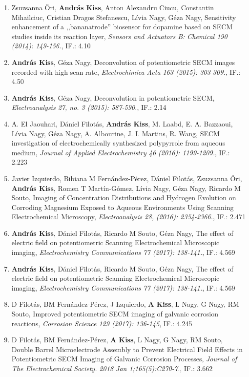 \documentclass[11pt,a4paper,roman]{article}
\begin{document}
\begin{enumerate}
\item Zsuzsanna \H{O}ri, \textbf{András Kiss}, Anton Alexandru Ciucu, Constantin Mihailciuc, Cristian Dragos Stefanescu, Lívia Nagy, Géza Nagy, Sensitivity enhancement of a ,,bananatrode'' biosensor for dopamine based on SECM studies inside its reaction layer, \emph{Sensors and Actuators B: Chemical 190 (2014): 149-156.}, IF.: 4.10

\item \textbf{András Kiss}, Géza Nagy, Deconvolution of potentiometric SECM images recorded with high scan rate, \emph{Electrochimica Acta 163 (2015): 303-309.}, IF.: 4.50

\item \textbf{András Kiss}, Géza Nagy, Deconvolution in potentiometric SECM, \emph{Electroanalysis 27, no. 3 (2015): 587-590.}, IF.: 2.14


\item A. El Jaouhari,  Dániel Filotás, \textbf{András Kiss}, M. Laabd, E. A. Bazzaoui, Lívia Nagy, Géza Nagy, A. Albourine, J. I. Martins, R. Wang, SECM investigation of electrochemically synthesized polypyrrole from aqueous medium, \emph{Journal of Applied Electrochemistry 46 (2016): 1199-1209.}, IF.: 2.223

\item Javier Izquierdo, Bibiana M Fernández-Pérez, Dániel Filotás, Zsuzsanna Őri, \textbf{András Kiss}, Romen T Martín-Gómez, Lívia Nagy, Géza Nagy, Ricardo M Souto, Imaging of Concentration Distributions and Hydrogen Evolution on Corroding Magnesium Exposed to Aqueous Environments Using Scanning Electrochemical Microscopy, \emph{Electroanalysis 28, (2016): 2354-2366.}, IF.: 2.471

\item \textbf{András Kiss}, Dániel Filotás, Ricardo M Souto, Géza Nagy, The effect of electric field on potentiometric Scanning Electrochemical Microscopic imaging, \emph{Electrochemistry Communications 77 (2017): 138-141.}, IF.: 4.569

\item \textbf{András Kiss}, Dániel Filotás, Ricardo M Souto, Géza Nagy, The effect of electric field on potentiometric Scanning Electrochemical Microscopic imaging, \emph{Electrochemistry Communications 77 (2017): 138-141.}, IF.: 4.569

\item D Filotás, BM Fernández-Pérez, J Izquierdo, \textbf{A Kiss}, L Nagy, G Nagy, RM Souto, Improved potentiometric SECM imaging of galvanic corrosion reactions, \emph{Corrosion Science 129 (2017): 136-145}, IF.: 4.245

\item D Filotás, BM Fernández-Pérez, \textbf{A Kiss}, L Nagy, G Nagy, RM Souto, Double Barrel Microelectrode Assembly to Prevent Electrical Field Effects in Potentiometric SECM Imaging of Galvanic Corrosion Processes, \emph{Journal of The Electrochemical Society. 2018 Jan 1;165(5):C270-7.}, IF.: 3.662
\end{enumerate}
\end{document}
